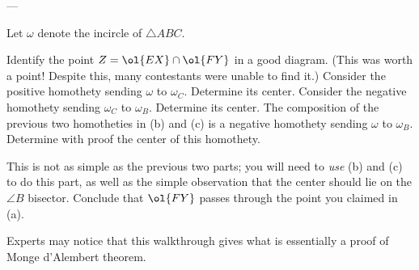 ---

Let $\omega$ denote the incircle of $\triangle ABC$.
\begin{walk}
  \ii Identify the point $Z = \ol{EX} \cap \ol{FY}$ in a good diagram.
  (This was worth a point! Despite this, many contestants were unable to find it.)
  \ii Consider the positive homothety sending $\omega$ to $\omega_C$.
  Determine its center.
  \ii Consider the negative homothety sending $\omega_C$ to $\omega_B$.
  Determine its center.
  \ii The composition of the previous two homotheties
  in (b) and (c) is a negative homothety
  sending $\omega$ to $\omega_B$.
  Determine with proof the center of this homothety.

  This is not as simple as the previous two parts;
  you will need to \emph{use} (b) and (c) to do this part,
  as well as the simple observation that the center
  should lie on the $\angle B$ bisector.
  \ii Conclude that $\ol{FY}$ passes through the point you claimed in (a).
\end{walk}
Experts may notice that this walkthrough gives what is essentially
a proof of Monge d'Alembert theorem.

